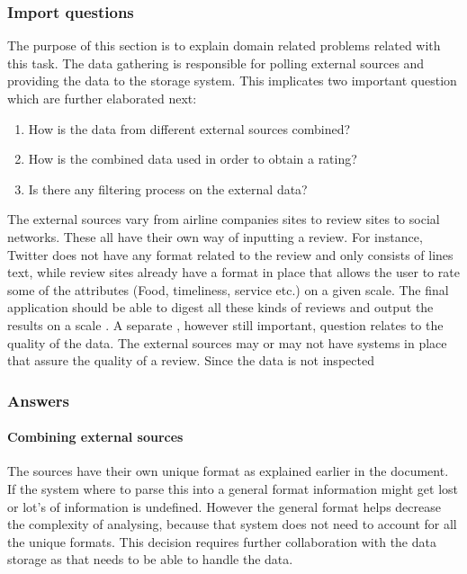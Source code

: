 \subsubsection{Import questions}
The purpose of this section is to explain domain related problems related with this task. The data gathering is responsible for polling external sources and providing the data to the storage system. This implicates two important question which are further elaborated next:
\begin{enumerate}
\item	How is the data from different external sources combined?
\item	How is the combined data used in order to obtain a rating?
\item	Is there any filtering process on the external data?
\end{enumerate}
The external sources vary from airline companies sites to review sites to social networks. These all have their own way of inputting a review. For instance, Twitter does not have any format related to the review and only consists of lines text, while review sites already have  a format in place that allows the user to rate some of the attributes (Food, timeliness, service etc.) on a given scale. The final application should be able to digest all these kinds of reviews and output the results on a scale . 
A separate , however still important, question relates to the quality of the data. The external sources may or may not have systems in place that assure the quality of a review. Since the data is not inspected 

\subsubsection{Answers}

\paragraph{Combining external sources}
The sources have their own unique format as explained earlier in the document. If the system where to parse this into a general format information might get lost or lot's of information is undefined.
However the general format helps decrease the complexity of analysing, because that system does not need to account for all the unique formats. This decision requires further collaboration with the data storage
as that needs to be able to handle the data. 

